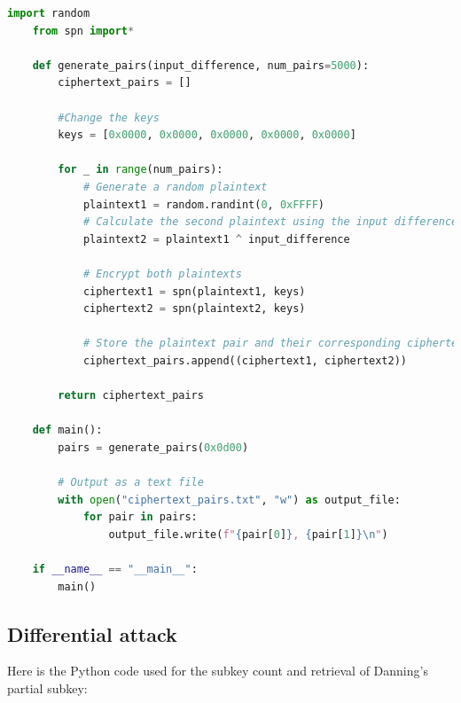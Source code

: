 \documentclass[letterpaper,12pt]{article}
\begin{document}
\begin{lstlisting}[language=Python, caption=Python code for plaintext pairs generation and encryption (generate.py), label=lts:gen]
    import random
    from spn import*

    def generate_pairs(input_difference, num_pairs=5000):
        ciphertext_pairs = []
        
        #Change the keys
        keys = [0x0000, 0x0000, 0x0000, 0x0000, 0x0000]

        for _ in range(num_pairs):
            # Generate a random plaintext
            plaintext1 = random.randint(0, 0xFFFF)
            # Calculate the second plaintext using the input difference
            plaintext2 = plaintext1 ^ input_difference
            
            # Encrypt both plaintexts
            ciphertext1 = spn(plaintext1, keys)
            ciphertext2 = spn(plaintext2, keys)

            # Store the plaintext pair and their corresponding ciphertexts
            ciphertext_pairs.append((ciphertext1, ciphertext2))

        return ciphertext_pairs

    def main():
        pairs = generate_pairs(0x0d00)

        # Output as a text file
        with open("ciphertext_pairs.txt", "w") as output_file:
            for pair in pairs:
                output_file.write(f"{pair[0]}, {pair[1]}\n")

    if __name__ == "__main__":
        main()
    \end{lstlisting}

\subsection*{Differential attack}
Here is the Python code used for the subkey count and retrieval of Danning's partial subkey:
\end{document}
